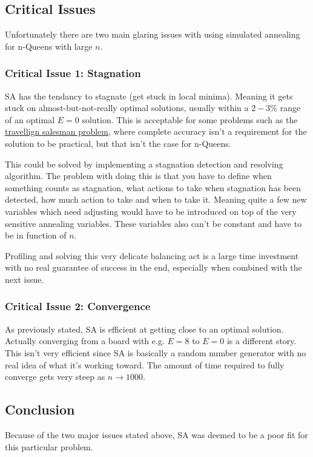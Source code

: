 \documentclass{article}
\begin{document}
\subsection{Critical Issues}
Unfortunately there are two main glaring issues with using simulated annealing for n-Queens with large \(n\).

\subsubsection{Critical Issue 1: Stagnation}
SA has the tendancy to stagnate (get stuck in local minima). Meaning it gets stuck on almost-but-not-really optimal solutions,
usually within a \(2-3\%\) range of an optimal \(E = 0\) solution.
This is acceptable for some problems such as the \href{https://en.wikipedia.org/wiki/Travelling_salesman_problem}{travellign salesman problem},
where complete accuracy isn't a requirement for the solution to be practical, but that isn't the case for n-Queens.

This could be solved by implementing a stagnation detection and resolving algorithm.
The problem with doing this is that you have to define when something counts as stagnation,
what actions to take when stagnation has been detected, how much action to take and when to take it.
Meaning quite a few new variables which need adjusting would have to be introduced on top of the very sensitive annealing variables.
These variables also can't be constant and have to be in function of \(n\).

Profiling and solving this very delicate balancing act is a large time investment with no real guarantee of success in the end,
especially when combined with the next issue.

\subsubsection{Critical Issue 2: Convergence}
As previously stated, SA is efficient at getting close to an optimal solution.
Actually converging from a board with e.g. \(E=8\) to \(E=0\) is a different story.
This isn't very efficient since SA is basically a random number generator with no real idea of what it's working toward.
The amount of time required to fully converge gets very steep as \(n \to 1000\).

\subsection{Conclusion}
Because of the two major issues stated above, SA was deemed to be a poor fit for this particular problem.
\end{document}
